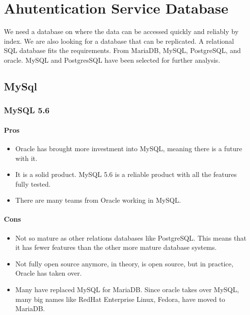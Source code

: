 \section{Ahutentication Service Database}


\indent
\indent
We need a database on where the data can be accessed quickly and reliably by index. We are also looking for a database that can be replicated. A relational SQL database fits the requirements. From MariaDB, MySQL, PostgreSQL, and oracle. MySQL and PostgresSQL have been selected for further analysis.

\subsection{MySql}

\subsubsection{MySQL 5.6 \cite{lbpcmysql}}  
\paragraph{Pros} 
\begin{itemize}
\item Oracle has brought more investment into MySQL, meaning there is a future with it.
 \item It is a solid product. MySQL 5.6 is a reliable product with all the features fully tested.

\item There are many teams from Oracle working in MySQL.
\end{itemize}

\paragraph{Cons}

\begin{itemize}

\item Not so mature as other relations databases like PostgreSQL. This means that it has fewer features than the other more mature database systems.
\item  Not fully open source anymore, in theory, is open source, but in practice, Oracle has taken over. 
\item Many have replaced MySQL for MariaDB. Since oracle takes over MySQL, many big names like RedHat Enterprise Linux, Fedora, have moved to MariaDB.
\end{itemize}
